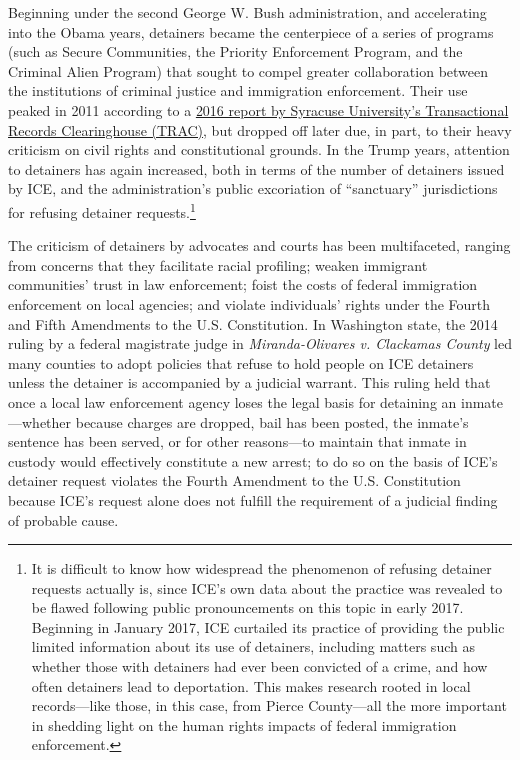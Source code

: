 \documentclass[12pt]{report}\usepackage[]{graphicx}\usepackage[]{color}
\begin{document}
Beginning under the second George W. Bush administration, and accelerating into the Obama years, detainers became the centerpiece of a series of programs (such as Secure Communities, the Priority Enforcement Program, and the Criminal Alien Program) that sought to compel greater collaboration between the institutions of criminal justice and immigration enforcement. Their use peaked in 2011 according to a \href{<http://trac.syr.edu/immigration/reports/458/>}{2016 report by Syracuse University's Transactional Records Clearinghouse (TRAC)}, but dropped off later due, in part, to their heavy criticism on civil rights and constitutional grounds. In the Trump years, attention to detainers has again increased, both in terms of the number of detainers issued by ICE, and the administration's public excoriation of ``sanctuary'' jurisdictions for refusing detainer requests.\footnote{It is difficult to know how widespread the phenomenon of refusing detainer requests actually is, since ICE's own data about the practice was revealed to be flawed following public pronouncements on this topic in early 2017. Beginning in January 2017, ICE curtailed its practice of providing the public limited information about its use of detainers, including matters such as whether those with detainers had ever been convicted of a crime, and how often detainers lead to deportation. This makes research rooted in local records---like those, in this case, from Pierce County---all the more important in shedding light on the human rights impacts of federal immigration enforcement.}

The criticism of detainers by advocates and courts has been multifaceted, ranging from concerns that they facilitate racial profiling; weaken immigrant communities' trust in law enforcement; foist the costs of federal immigration enforcement on local agencies; and violate individuals' rights under the Fourth and Fifth Amendments to the U.S. Constitution. In Washington state, the 2014 ruling by a federal magistrate judge in \emph{Miranda-Olivares v. Clackamas County} led many counties to adopt policies that refuse to hold people on ICE detainers unless the detainer is accompanied by a judicial warrant. This ruling held that once a local law enforcement agency loses the legal basis for detaining an inmate---whether because charges are dropped, bail has been posted, the inmate's sentence has been served, or for other reasons---to maintain that inmate in custody would effectively constitute a new arrest; to do so on the basis of ICE's detainer request violates the Fourth Amendment to the U.S. Constitution because ICE's request alone does not fulfill the requirement of a judicial finding of probable cause.
\end{document}
